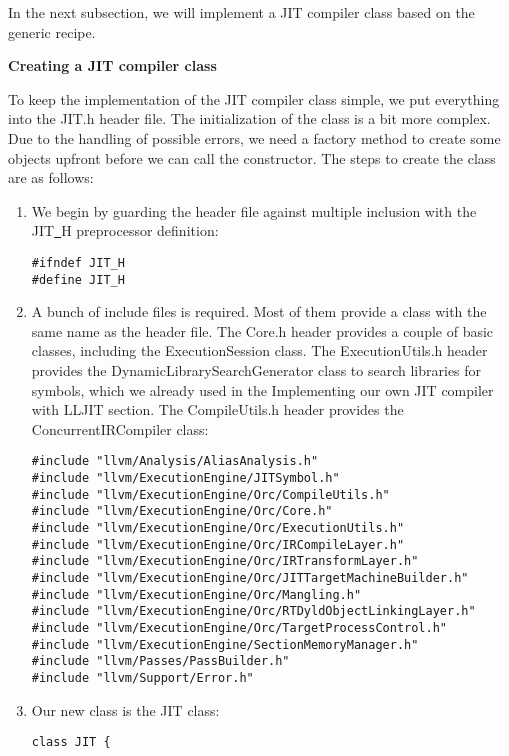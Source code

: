 In the next subsection, we will implement a JIT compiler class based on the generic recipe.\par

\hspace*{\fill} \par %
\textbf{Creating a JIT compiler class}

To keep the implementation of the JIT compiler class simple, we put everything into the JIT.h header file. The initialization of the class is a bit more complex. Due to the handling of possible errors, we need a factory method to create some objects upfront before we can call the constructor. The steps to create the class are as follows:\par

\begin{enumerate}
\item We begin by guarding the header file against multiple inclusion with the JIT\underline{~}H preprocessor definition:
\begin{lstlisting}[caption={}]
#ifndef JIT_H
#define JIT_H
\end{lstlisting}

\item A bunch of include files is required. Most of them provide a class with the same name as the header file. The Core.h header provides a couple of basic classes, including the ExecutionSession class. The ExecutionUtils.h header provides the DynamicLibrarySearchGenerator class to search libraries for symbols, which we already used in the Implementing our own JIT compiler with LLJIT section. The CompileUtils.h header provides the ConcurrentIRCompiler class:
\begin{lstlisting}[caption={}]
#include "llvm/Analysis/AliasAnalysis.h"
#include "llvm/ExecutionEngine/JITSymbol.h"
#include "llvm/ExecutionEngine/Orc/CompileUtils.h"
#include "llvm/ExecutionEngine/Orc/Core.h"
#include "llvm/ExecutionEngine/Orc/ExecutionUtils.h"
#include "llvm/ExecutionEngine/Orc/IRCompileLayer.h"
#include "llvm/ExecutionEngine/Orc/IRTransformLayer.h"
#include "llvm/ExecutionEngine/Orc/JITTargetMachineBuilder.h"
#include "llvm/ExecutionEngine/Orc/Mangling.h"
#include "llvm/ExecutionEngine/Orc/RTDyldObjectLinkingLayer.h"
#include "llvm/ExecutionEngine/Orc/TargetProcessControl.h"
#include "llvm/ExecutionEngine/SectionMemoryManager.h"
#include "llvm/Passes/PassBuilder.h"
#include "llvm/Support/Error.h"
\end{lstlisting}

\item Our new class is the JIT class:
\begin{lstlisting}[caption={}]
class JIT {
\end{lstlisting}


\end{enumerate}
